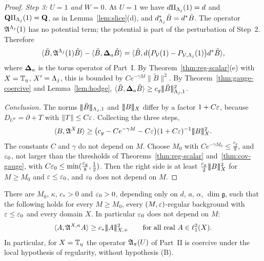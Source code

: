 \begin{proof}
\emph{Step 3: $U=1$ and $W=0$.} At $U=1$ we have $d\Pi_{\Lambda_j}(1)=d$ and $\mathbf Q\Pi_{\Lambda_j}(1)=\mathbf Q$, as in Lemma~\ref{lem:slice}(d), and $d^*_{\Lambda_j}\tilde B=d^*\tilde B$. The operator $\mathfrak A^{\Lambda_j}(1)$ has no potential term; the potential is part of the perturbation of Step~2. Therefore
\[
\langle \tilde B,\mathfrak A^{\Lambda_j}(1)\tilde B\rangle-\langle \tilde B,\boldsymbol{\Delta}_a\tilde B\rangle=\langle \tilde B,d\big(P_\mathcal V(1)-P_{\mathcal V,\Lambda_j}(1)\big)d^*\tilde B\rangle,
\]
where $\boldsymbol{\Delta}_a$ is the torus operator of Part~I. By Theorem~\ref{thm:reg-scalar}(e) with $X=\mathbb T_\eta$, $X'=\Lambda_j$, this is bounded by $Ce^{-\gamma M}\|\tilde B\|^2$. By Theorem~\ref{thm:gauge-coercive} and Lemma~\ref{lem:hodge}, $\langle \tilde B,\boldsymbol{\Delta}_a\tilde B\rangle\ge c_g|\!|\!|\tilde B|\!|\!|^2_{\Lambda_j,1}$.

\emph{Conclusion.} The norms $|\!|\!|\tilde B|\!|\!|_{\Lambda_j,1}$ and $|\!|\!|B|\!|\!|_X$ differ by a factor $1+C\varepsilon$, because $D_{U^u}=\partial+T$ with $\|T\|\le C\varepsilon$. Collecting the three steps,
\[
\langle B,\mathfrak A^XB\rangle\ge\big(c_g-Ce^{-\gamma M}-C\varepsilon\big)(1+C\varepsilon)^{-1}|\!|\!|B|\!|\!|_X^2 .
\]
The constants $C$ and $\gamma$ do not depend on $M$. Choose $M_0$ with $Ce^{-\gamma M_0}\le\frac{c_g}8$, and $\varepsilon_0$, not larger than the thresholds of Theorems~\ref{thm:reg-scalar} and~\ref{thm:cov-gauge}, with $C\varepsilon_0\le\min(\frac{c_g}8,\frac12)$. Then the right side is at least $\frac{c_g}2|\!|\!|B|\!|\!|_X^2$ for $M\ge M_0$ and $\varepsilon\le\varepsilon_0$, and $\varepsilon_0$ does not depend on $M$.
\end{proof}

\begin{theorem}\label{thm:reg-coercive}
There are $M_0$, $\kappa$, $c_*>0$ and $\varepsilon_0>0$, depending only on $d$, $a$, $\alpha$, $\dim\mathfrak g$, such that the following holds for every $M\ge M_0$, every $(M,\varepsilon)$-regular background with $\varepsilon\le\varepsilon_0$ and every domain $X$. In particular $\varepsilon_0$ does not depend on $M$:
\[
\langle A,\mathfrak A^{X,\kappa}A\rangle\ge c_*|\!|\!|A|\!|\!|_{X,+}^2\qquad\text{for all real }A\in\ell^2_1(X).
\]
In particular, for $X=\mathbb T_\eta$ the operator $\mathfrak A_\pi(U)$ of Part~II is coercive under the local hypothesis of regularity, without hypothesis (B).
\end{theorem}

